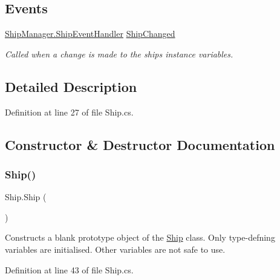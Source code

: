 \subsection*{Events}
\begin{DoxyCompactItemize}
\item 
\hyperlink{class_ship_manager_a9dbbc387497ab2f4fc7c90cde65dfd4d}{Ship\+Manager.\+Ship\+Event\+Handler} \hyperlink{class_ship_a007fdacf563e7678e489bb8c0fc82a65}{Ship\+Changed}
\begin{DoxyCompactList}\small\item\em Called when a change is made to the ship\textquotesingle{}s instance variables. \end{DoxyCompactList}\end{DoxyCompactItemize}


\subsection{Detailed Description}


Definition at line 27 of file Ship.\+cs.



\subsection{Constructor \& Destructor Documentation}
\mbox{\label{class_ship_ad5e5b275a4936c74279a8efb7412cc2c}} 
\subsubsection{\texorpdfstring{Ship()}{Ship()}\hspace{0.1cm}{\footnotesize\ttfamily [1/2]}}
{\footnotesize\ttfamily Ship.\+Ship (\begin{DoxyParamCaption}{ }\end{DoxyParamCaption})}



Constructs a blank prototype object of the \hyperlink{class_ship}{Ship} class. Only type-\/defning variables are initialised. Other variables are not safe to use. 



Definition at line 43 of file Ship.\+cs.

\mbox{\label{class_ship_a4cefe98d88c50eb364b5baec61e23b95}} 
